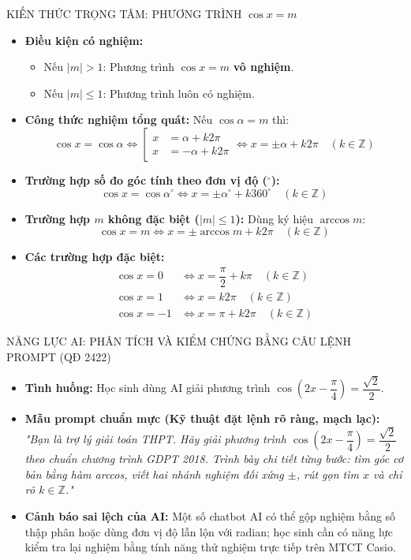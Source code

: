 \documentclass[12pt, a4paper]{article}
\begin{document}
\begin{pedabox}{KIẾN THỨC TRỌNG TÂM: PHƯƠNG TRÌNH $\cos x = m$}  
\begin{itemize}[leftmargin=0.6cm]  
    \item \textbf{Điều kiện có nghiệm:}  
    \begin{itemize}  
        \item Nếu $|m| > 1$: Phương trình $\cos x = m$ \textbf{vô nghiệm}.  
        \item Nếu $|m| \le 1$: Phương trình luôn có nghiệm.  
    \end{itemize}  
    \item \textbf{Công thức nghiệm tổng quát:}  
    Nếu $\cos\alpha = m$ thì:  
    $$\cos x = \cos\alpha \iff \left[\begin{aligned} x &= \alpha + k2\pi \\ x &= -\alpha + k2\pi \end{aligned}\right. \iff x = \pm\alpha + k2\pi \quad (k \in \mathbb{Z})$$  
    \item \textbf{Trường hợp số đo góc tính theo đơn vị độ ($^\circ$):}  
    $$\cos x = \cos\alpha^\circ \iff x = \pm\alpha^\circ + k360^\circ \quad (k \in \mathbb{Z})$$  
    \item \textbf{Trường hợp $m$ không đặc biệt ($|m| \le 1$):} Dùng ký hiệu $\arccos m$:  
    $$\cos x = m \iff x = \pm\arccos m + k2\pi \quad (k \in \mathbb{Z})$$  
    \item \textbf{Các trường hợp đặc biệt:}  
    \begin{align*}  
        \cos x = 0 &\iff x = \dfrac{\pi}{2} + k\pi \quad (k \in \mathbb{Z}) \\  
        \cos x = 1 &\iff x = k2\pi \quad (k \in \mathbb{Z}) \\  
        \cos x = -1 &\iff x = \pi + k2\pi \quad (k \in \mathbb{Z})  
    \end{align*}  
\end{itemize}  
\end{pedabox}  
  
\begin{aibox}{NĂNG LỰC AI: PHÂN TÍCH VÀ KIỂM CHỨNG BẰNG CÂU LỆNH PROMPT (QĐ 2422)}  
\begin{itemize}[leftmargin=0.6cm]  
    \item \textbf{Tình huống:} Học sinh dùng AI giải phương trình $\cos\left(2x - \dfrac{\pi}{4}\right) = \dfrac{\sqrt{2}}{2}$.  
    \item \textbf{Mẫu prompt chuẩn mực (Kỹ thuật đặt lệnh rõ ràng, mạch lạc):}  
    \textit{"Bạn là trợ lý giải toán THPT. Hãy giải phương trình $\cos\left(2x - \dfrac{\pi}{4}\right) = \dfrac{\sqrt{2}}{2}$ theo chuẩn chương trình GDPT 2018. Trình bày chi tiết từng bước: tìm góc cơ bản bằng hàm arccos, viết hai nhánh nghiệm đối xứng $\pm$, rút gọn tìm $x$ và chỉ rõ $k \in \mathbb{Z}$."}  
    \item \textbf{Cảnh báo sai lệch của AI:} Một số chatbot AI có thể gộp nghiệm bằng số thập phân hoặc dùng đơn vị độ lẫn lộn với radian; học sinh cần có năng lực kiểm tra lại nghiệm bằng tính năng thử nghiệm trực tiếp trên MTCT Casio.  
\end{itemize}  
\end{aibox}  
  
\end{document}
